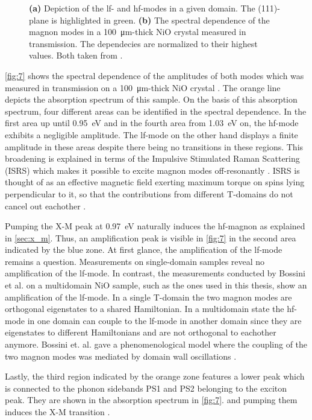 \begin{figure}[htb!]
\begin{subfigure}[c]{0.5\textwidth}
        \caption{}
        \label{fig:7}
    \end{subfigure}
    \vspace{-0.3cm}
    \caption{\textbf{(a)} Depiction of the lf- and hf-modes in a given domain. The (111)-plane is highlighted in green. \textbf{(b)} The spectral dependence of the magnon modes in a \qty{100}{\um}-thick NiO crystal measured in transmission. The dependecies are normalized to their highest values. Both taken from .}
\end{figure}
\FloatBarrier
\autoref{fig:7} shows the spectral dependence of the amplitudes of both modes which was measured in transmission on a \qty{100}{\um}-thick NiO crystal .
The orange line depicts the absorption spectrum of this sample.
On the basis of this absorption spectrum, four different areas can be identified in the spectral dependence.
In the first area up until \qty{0.95}{eV} and in the fourth area from \qty{1.03}{eV} on, the hf-mode exhibits a negligible amplitude.
The lf-mode on the other hand displays a finite amplitude in these areas despite there being no transitions in these regions.
This broadening is explained in terms of the Impulsive Stimulated Raman Scattering (ISRS)  which makes it possible to excite magnon modes off-resonantly .
ISRS is thought of as an effective magnetic field exerting maximum torque on spins lying perpendicular to it, so that the contributions from different T-domains do not cancel out eachother .

Pumping the X-M peak at \qty{0.97}{eV} naturally induces the hf-magnon as explained in \autoref{sec:x_m}.
Thus, an amplification peak is visible in \autoref{fig:7} in the second area indicated by the blue zone.
At first glance, the amplification of the lf-mode remains a question.
Measurements on single-domain samples reveal no amplification of the lf-mode.
In contrast, the measurements conducted by Bossini et al. on a multidomain NiO sample, such as the ones used in this thesis, show an amplification of the lf-mode.
In a single T-domain the two magnon modes are orthogonal eigenstates to a shared Hamiltonian.
In a multidomain state the hf-mode in one domain can couple to the lf-mode in another domain since they are eigenstates to different Hamiltonians and are not orthogonal to eachother anymore.
Bossini et. al. gave a phenomenological model where the coupling of the two magnon modes was mediated by domain wall oscillations .

Lastly, the third region indicated by the orange zone features a lower peak which is connected to the phonon sidebands PS1 and PS2 belonging to the exciton peak.
They are shown in the absorption spectrum in \autoref{fig:7}. and pumping them induces the X-M transition .